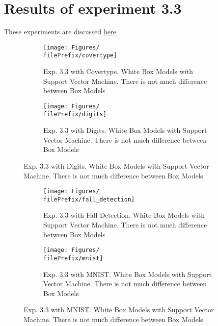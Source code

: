 
\newcommand{\major}{3}
\newcommand{\minor}{3}

\newcommand{\undPrefix}{\major_\minor}
\newcommand{\dotPrefix}{\major.\minor}
\newcommand{\scoPrefix}{\major-\minor}
\newcommand{\filePrefix}{\undPrefix}

\chapter{Results of experiment \dotPrefix} %


\label{Appendix\scoPrefix} %

These experiments are discussed \hyperref[disc:h3]{here}
\begin{figure}[ht]
  \centering
  \begin{subfigure}[t]{0.5\linewidth}
    \centering\captionsetup{width=.8\linewidth}\texttt{[image: Figures/\\filePrefix/covertype]}
    \caption{Exp. 3.3 with Covertype. White Box Models with Support Vector Machine. There is not much difference between Box Models}
    \label{fig:\undPrefix_covertype}
  \end{subfigure}%
  \begin{subfigure}[t]{0.5\linewidth}
    \centering\captionsetup{width=.8\linewidth}\texttt{[image: Figures/\\filePrefix/digits]}
    \caption{Exp. 3.3 with Digits. White Box Models with Support Vector Machine. There is not much difference between Box Models}
    \label{fig:\undPrefix_digits}
  \end{subfigure}
\end{figure}


\begin{figure}[ht]
  \centering
  \begin{subfigure}[t]{0.5\linewidth}
    \centering\captionsetup{width=.8\linewidth}\texttt{[image: Figures/\\filePrefix/fall\_detection]}
    \caption{Exp. 3.3 with Fall Detection. White Box Models with Support Vector Machine. There is not much difference between Box Models}
    \label{fig:\undPrefix_fall_detection}
  \end{subfigure}%
  \begin{subfigure}[t]{0.5\linewidth}
    \centering\captionsetup{width=.8\linewidth}\texttt{[image: Figures/\\filePrefix/mnist]}
    \caption{Exp. 3.3 with MNIST. White Box Models with Support Vector Machine. There is not much difference between Box Models}
    \label{fig:\undPrefix_mnist}
  \end{subfigure}
\end{figure}


